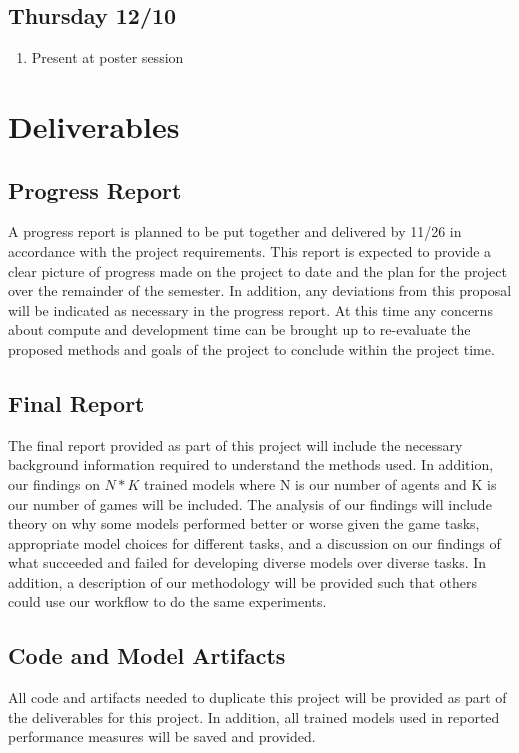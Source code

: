 \documentclass[conference]{IEEEtran}
\begin{document}
\subsection{Thursday 12/10}
\begin{enumerate}
    \item Present at poster session
\end{enumerate}

\section{Deliverables}

\subsection{Progress Report}
A progress report is planned to be put together and delivered by 11/26 in accordance with the project requirements.
This report is expected to provide a clear picture of progress made on the project to date and the plan for the project over the remainder of the semester.
In addition, any deviations from this proposal will be indicated as necessary in the progress report. At this time any concerns about compute and development time can be brought up to re-evaluate the proposed methods and goals of the project to conclude within the project time.

\subsection{Final Report}
The final report provided as part of this project will include the necessary background information required to understand the methods used.
In addition, our findings on $N*K$ trained models where N is our number of agents and K is our number of games will be included.
The analysis of our findings will include theory on why some models performed better or worse given the game tasks, appropriate model choices for different tasks, and a discussion on our findings of what succeeded and failed for developing diverse models over diverse tasks.
In addition, a description of our methodology will be provided such that others could use our workflow to do the same experiments.

\subsection{Code and Model Artifacts}
All code and artifacts needed to duplicate this project will be provided as part of the deliverables for this project.
In addition, all trained models used in reported performance measures will be saved and provided.
\end{document}
